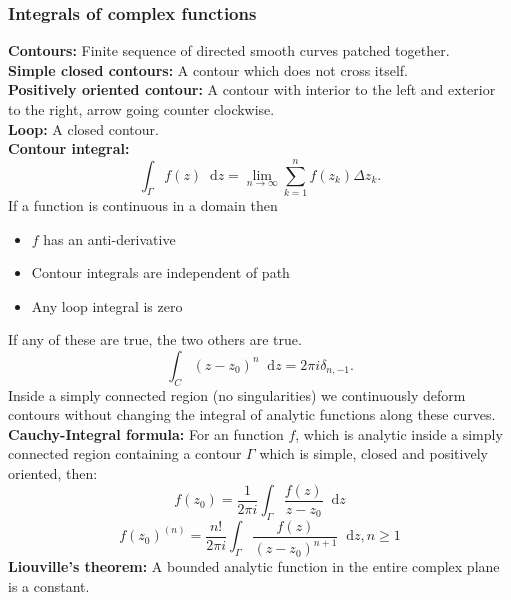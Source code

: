 \documentclass[a4paper, 10pt]{article}
\newcommand*\diff{\mathop{}\!\mathrm{d}}
\begin{document}
\begin{multicols*}{3}
\subsubsection*{Integrals of complex functions}
\textbf{Contours:} Finite sequence of directed smooth curves patched together.\\
\textbf{Simple closed contours:} A contour which does not cross itself.\\
\textbf{Positively oriented contour:} A contour with interior to the left and exterior to the right, arrow going counter clockwise.\\
\textbf{Loop:} A closed contour.\\
\textbf{Contour integral:}
\begin{equation*}
  \int_{\Gamma} f(z) \diff z = \lim_{n\to\infty} \sum_{k=1}^{n} f(z_k) \Delta z_k.
\end{equation*}
If a function is continuous in a domain then
\begin{itemize}
  \item $f$ has an anti-derivative
  \item Contour integrals are independent of path
  \item Any loop integral is zero
\end{itemize}
If any of these are true, the two others are true.\\
\begin{equation*}
  \int_{C} (z-z_0)^n \diff z = 2\pi i \delta_{n, -1}.
\end{equation*}
Inside a simply connected region (no singularities) we continuously deform contours without changing the integral of analytic functions along these curves.\\
\textbf{Cauchy-Integral formula:}
For an function $f$, which is analytic inside a simply connected region containing a contour $\Gamma$ which is simple, closed and positively oriented, then:
\begin{equation*}
  f(z_0) = \frac{1}{2\pi i} \int_{\Gamma} \frac{f(z)}{z-z_0} \diff z
\end{equation*}
\begin{equation*}
  f(z_0)^{(n)} = \frac{n!}{2\pi i} \int_{\Gamma} \frac{f(z)}{(z-z_0)^{n+1}} \diff z, n\geq 1
\end{equation*}
\textbf{Liouville's theorem:} A bounded analytic function in the entire complex plane is a constant.\\

\end{multicols*}
\end{document}
